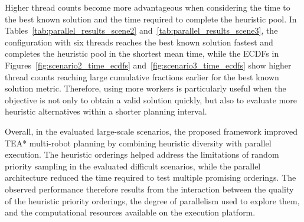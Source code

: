 Higher thread counts become more advantageous when considering the time to the best known
solution and the time required to complete the heuristic pool. In
Tables~\ref{tab:parallel_results_scene2} and~\ref{tab:parallel_results_scene3}, the configuration
with six threads reaches the best known solution fastest and completes the heuristic pool in the
shortest mean time, while the ECDFs in Figures~\ref{fig:scenario2_time_ecdfs}
and~\ref{fig:scenario3_time_ecdfs} show higher thread counts reaching large cumulative fractions
earlier for the best known solution metric. Therefore, using more workers is particularly useful
when the objective is not only to obtain a valid solution quickly, but also to evaluate more
heuristic alternatives within a shorter planning interval.

Overall, in the evaluated large-scale scenarios, the proposed framework improved TEA* multi-robot
planning by combining heuristic diversity with parallel execution. The heuristic orderings helped address
the limitations of random priority sampling in the evaluated difficult scenarios, while the parallel architecture
reduced the time required to test multiple promising orderings. The observed performance therefore
results from the interaction between the quality of the heuristic priority orderings, the degree of
parallelism used to explore them, and the computational resources available on the execution
platform.